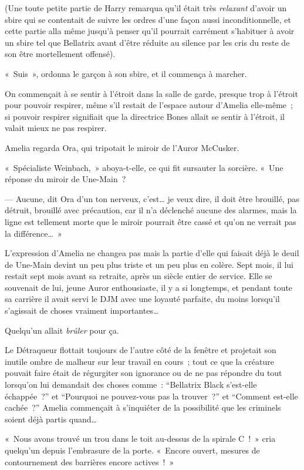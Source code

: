 (Une toute petite partie de Harry remarqua qu'il était très \emph{relaxant} d'avoir un sbire qui se contentait de suivre les ordres d'une façon aussi inconditionnelle, et cette partie alla même jusqu'à penser qu'il pourrait carrément s'habituer à avoir un sbire tel que Bellatrix avant d'être réduite au silence par les cris du reste de son être mortellement offensé).

«~Suis~», ordonna le garçon à son sbire, et il commença à marcher.

\later

On commençait à se sentir à l'étroit dans la salle de garde, presque trop à l'étroit pour pouvoir respirer, même s'il restait de l'espace autour d'Amelia elle-même~; si pouvoir respirer signifiait que la directrice Bones allait se sentir à l'étroit, il valait mieux ne pas respirer.

Amelia regarda Ora, qui tripotait le miroir de l'Auror McCusker.

«~Spécialiste Weinbach,~» aboya-t-elle, ce qui fit sursauter la sorcière.
«~Une réponse du miroir de Une-Main~?

--- Aucune, dit Ora d'un ton nerveux, c'est… je veux dire, il doit être brouillé, pas détruit, brouillé avec précaution, car il n'a déclenché aucune des alarmes, mais la ligne est tellement morte que le miroir pourrait être cassé et qu'on ne verrait pas la différence…~»

L'expression d'Amelia ne changea pas mais la partie d'elle qui faisait déjà le deuil de Une-Main devint un peu plus triste et un peu plus en colère.
Sept mois, il lui restait sept mois avant sa retraite, après un siècle entier de service.
Elle se souvenait de lui, jeune Auror enthousiaste, il y a si longtemps, et pendant toute sa carrière il avait servi le DJM avec une loyauté parfaite, du moins lorsqu'il s'agissait de choses vraiment importantes…

Quelqu'un allait \emph{brûler} pour ça.

Le Détraqueur flottait toujours de l'autre côté de la fenêtre et projetait son inutile ombre de malheur sur leur travail en cours~; tout ce que la créature pouvait faire était de régurgiter son ignorance ou de ne pas répondre du tout lorsqu'on lui demandait des choses comme~: “Bellatrix Black s'est-elle échappée~?” et “Pourquoi ne pouvez-vous pas la trouver~?” et “Comment est-elle cachée~?” Amelia commençait à s'inquiéter de la possibilité que les criminels soient déjà partis quand…

«~Nous avons trouvé un trou dans le toit au-dessus de la spirale C~!~»
cria quelqu'un depuis l'embrasure de la porte.
«~Encore ouvert, mesures de contournement des barrières encore actives~!~»

